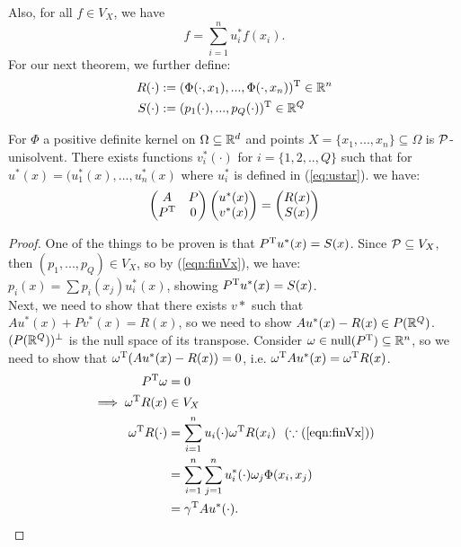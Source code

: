 \documentclass[twoside]{memoir}
\begin{document}
Also, for all $f \in V_X$, we have 
\begin{equation} \label{eqn:finVx}
f = \sum_{i=1}^{n} u_i^* f(x_i).
\end{equation}
For our next theorem, we further define:
\begin{equation}
\begin{split}
R(\cdot) &:= (\Phi(\cdot, x_1),..., \Phi(\cdot, x_n))^{\text{T}} \in \mathbb{R}^n\\
S(\cdot) &:= (p_1(\cdot),..., p_Q(\cdot))^{\text{T}} \in \mathbb{R}^Q \\
\end{split}
\end{equation}
\begin{thm}
	For $\Phi$ a positive definite kernel on $\Omega \subseteq \mathbb{R}^d$ and points $X = \{ x_1,..., x_n \} \subseteq \Omega$ is $\mathcal{P}$-unisolvent. There exists functions $v_i^*(\cdot)$ for $i = \{ 1, 2, .., Q \} $ such that for $u^*(x) = (u^*_1(x), ..., u^*_n(x)$ where $u^*_i$ is defined in (\ref{eq:ustar}). we have:
	\begin{equation} \label{eqn:vstar}
	\begin{pmatrix}
	A & P \\
	P^{\text{T}} & 0 \\
	\end{pmatrix}
	\begin{pmatrix}
	u^*(x)\\ v^*(x)
	\end{pmatrix}
	=
	\begin{pmatrix}
	R(x)\\ S(x)
	\end{pmatrix}
	\end{equation}
\end{thm}
\begin{proof}
	One of the things to be proven is that $P^{\text{T}} u^*(x) = S(x)$. Since $\mathcal{P} \subseteq V_X$, then $(p_1,..., p_Q) \in V_X$, so by (\ref{eqn:finVx}), we have: $p_i(x) = \sum p_i(x_j)u_i^*(x)$, showing $P^{\text{T}} u^*(x) = S(x)$.\\
	Next, we need to show that there exists $v*$ such that $Au^*(x) + Pv^*(x) = R(x)$, so we need to show $Au^*(x) - R(x) \in P(\mathbb{R}^Q)$.\\
	$(P(\mathbb{R}^Q))^\perp$ is the null space of its transpose. Consider $\omega \in \text{null}(P^{\text{T}}) \subseteq \mathbb{R}^n$, so we need to show that $\omega^{\text{T}} (Au^*(x) - R(x)) = 0$, i.e. $\omega^{\text{T}} Au^*(x) = \omega^{\text{T}} R(x)$.\\
	\begin{equation*}
	\begin{split}
	P^{\text{T}} \omega &= 0\\
	\implies \omega^{\text{T}} R(x) &\in V_X\\
	\omega^{\text{T}} R(\cdot) &= \sum_{i=1}^{n}u_i(\cdot)\omega^{\text{T}} R(x_i) ~~(\because (\ref{eqn:finVx}))\\
	&= \sum_{i=1}^{n} \sum_{j=1}^{n} u_i^*(\cdot) \omega_j \Phi(x_i, x_j) \\
	&= \gamma^{\text{T}} A u^*(\cdot).\\
	\end{split}
	\end{equation*}
\end{proof}
\end{document}
